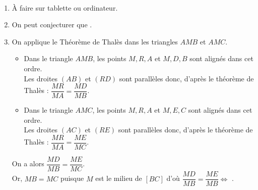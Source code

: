 \ \\ [-5mm]
\begin{enumerate}
      \item À faire sur tablette ou ordinateur.
      \item On peut conjecturer que .
      \item On applique le Théorème de Thalès dans les triangles $AMB$ et $AMC$.
      \begin{itemize}
         \item Dans le triangle $AMB$, les points $M, R, A$ et $M, D, B$ sont alignés dans cet ordre. \\
         Les droites $(AB)$ et $(RD)$ sont parallèles donc, d'après le théorème de Thalès : $\dfrac{MR}{MA} =\dfrac{MD}{MB}$.
         \item Dans le triangle $AMC$, les points $M, R, A$ et $M, E, C$ sont alignés dans cet ordre. \\
         Les droites $(AC)$ et $(RE)$ sont parallèles donc, d'après le théorème de Thalès : $\dfrac{MR}{MA} =\dfrac{ME}{MC}$.
   \end{itemize}
   On a alors $\dfrac{MD}{MB} =\dfrac{ME}{MC}$. \\
   Or, $MB =MC$ puisque $M$ est le milieu de $[BC]$ d'où $\dfrac{MD}{MB} =\dfrac{ME}{MB} \iff$ .
   \end{enumerate}
